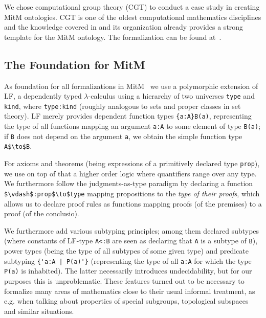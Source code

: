 We chose computational group theory (CGT) to conduct a case study in creating MitM ontologies. CGT is one of the oldest computational mathematics disciplines and the knowledge covered in \GAP and its organization already provides a strong template for the MitM ontology. The formalization can be found at~\cite{mitm:groups:on}.

\subsection{The Foundation for MitM}
As foundation for all formalizations in MitM~\cite{mitm:foundation:on} we use a polymorphic extension of LF, a dependently typed $\lambda$-calculus using a hierarchy
of two universes \lstinline|type| and \lstinline|kind|, where \lstinline|type:kind| (roughly analogous to sets and proper classes in set theory). 
LF merely provides dependent function types \lstinline|{a:A}B(a)|, representing the type of all functions mapping an argument \lstinline|a:A| to some element of type \lstinline|B(a)|; if \lstinline|B| does not depend on the argument \lstinline|a|, we obtain the simple function type \lstinline[mathescape]|A$\to$B|. 

For axioms and theorems (being expressions of a primitively declared type \lstinline|prop|), we use on top of that a higher order logic where quantifiers range over any type. We furthermore follow the judgments-as-type paradigm by declaring a function \lstinline[mathescape]|$\vdash$:prop$\to$type| mapping propositions to the \emph{type of their proofs}, which allows us to declare proof rules as functions mapping proofs (of the premises) to a proof (of the conclusio).

We furthermore add various subtyping principles; among them declared subtypes (where constants of LF-type \lstinline|A<:B| are seen as declaring that \lstinline|A| is a subtype of \lstinline|B|), power types (being the type of all subtypes of some given type) and predicate subtyping \lstinline?{'a:A | P(a)'}? (representing the type of all \lstinline|a:A| for which the type \lstinline|P(a)| is inhabited). The latter necessarily introduces undecidability, but for our purposes this is unproblematic. These features turned out to be necessary to formalize many areas of mathematics close to their usual informal treatment, as e.g. when talking about properties of special subgroups, topological subspaces and similar situations.

